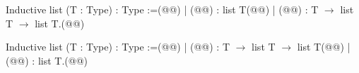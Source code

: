 Inductive list (T : Type) : Type :=(@\vspace{-0.04cm}@)
| (@@) : list T(@\vspace{-0.04cm}@)
| (@@) :  T $\rightarrow$ list T $\rightarrow$ list T.(@\vspace{-0.04cm}@)

Inductive list (T : Type) : Type :=(@\vspace{-0.04cm}@)
| (@@) : T $\rightarrow$ list T $\rightarrow$ list T(@\vspace{-0.04cm}@)
| (@@) : list T.(@\vspace{-0.04cm}@)



